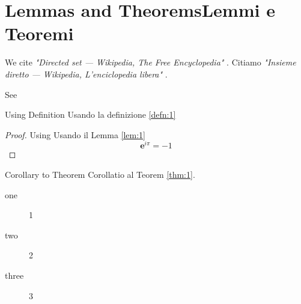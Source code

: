 \section[L and T]{\ifCDLeng Lemmas and Theorems\fi\ifCDLita Lemmi e Teoremi\fi}

\CDLeng We cite \emph{"Directed set --- {Wikipedia}{,} The Free Encyclopedia"} \cite{enwiki:1103032969}.
\CDLita Citiamo \emph{"Insieme diretto --- Wikipedia{,} L'enciclopedia libera"} \cite{itwiki:102088385}.

\begin{Lem}[Cauchy]\label{lem:1}
  \lipsum[3]

  See \cite{wiki:it:tautol}
\end{Lem}

\begin{Theorem}\label{thm:1}
  \CDLeng Using Definition
  \CDLita Usando la definizione
  \ref{defn:1} \\
  \lipsum[4]
  \begin{proof}
    \CDLeng Using 
    \CDLita Usando il Lemma \ref{lem:1}
    \begin{equation}
      \label{eq:1}
      {\mathbf{e}}^{i \pi }=-1
    \end{equation}
  \end{proof}
\end{Theorem}


\begin{Cor}\label{cor:1}
  \CDLeng Corollary to Theorem
  \CDLita Corollatio al Teorem
  \ref{thm:1}.
  \\
  \lipsum[6]
\end{Cor}

\begin{description}
\item[one] 1
\item[two] 2 %
\item[three] 3
\end{description}


